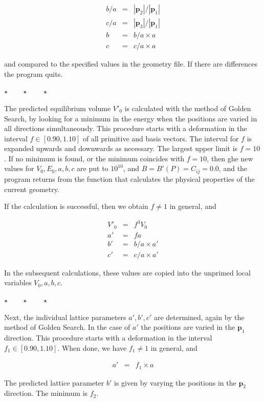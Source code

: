 \documentclass[a4paper,12pt,onecolumn]{article}
\def\p{\mathbf{p}}
\newcommand{\stars}{\begin{center} \vspace{0.5cm}$\star \qquad \star \qquad \star$\vspace{0.5cm}\end{center}}
\begin{document}
\begin{eqnarray}
b/a &=& |\p_2|  / |\p_1| \\
c/a &=& |\p_3| / |\p_1| \\
b   &=& b/a \times a \\
c   &=& c/a \times a
\end{eqnarray}

and compared to the specified values in the geometry file. If there are
differences the program quits.


\stars


The predicted equilibrium volume $V'_0$ is calculated with the method of Golden Search,
by looking for a minimum in the energy when the positions are varied in all directions
simultaneously. This procedure starts with a deformation in the interval $f \in [0.90, 1.10]$
of all primitive and basis vectors.
The interval for $f$ is expanded upwards and downwards as necessary.
The largest upper limit is $f = 10$. If no minimum is found,
or the minimum coincides with $f = 10$, then ghe new values for
$V_0, E_0, a, b, c$ are put to $10^{10}$, and
$B = B'(P) = C_{ij} = 0.0$, and the program returns from the function
that calculates the physical properties of the current geometry.

If the calculation is successful, then we obtain $f \neq 1$ in general, and

\begin{eqnarray}
V'_0 &=& f^3 V_0 \\
a'  &=& f a \\
b'   &=& b/a \times a' \\
c'   &=& c/a \times a'
\end{eqnarray}

In the subsequent calculations, these values are copied into the
unprimed local variables $V_0, a, b, c$.


\stars

Next, the individual lattice parameters $a',b',c'$ are determined, again
by the method of Golden Search.
In the case of $a'$ the positions are varied in the $\p_1$ direction.
This procedure starts with a deformation in the interval $f_1 \in [0.90, 1.10]$.
When done, we have $f_1 \neq 1$ in general, and

\begin{eqnarray}
a' &=& f_1 \times a
\end{eqnarray}

The predicted lattice parameter $b'$ is given by varying the positions in the
$\p_2$ direction. The minimum is $f_2$.
\end{document}
